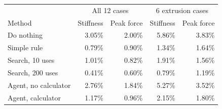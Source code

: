 \begin{tabular}{lrrrr}
\toprule
& \multicolumn{2}{c}{All 12 cases} & \multicolumn{2}{c}{6 extrusion cases} \\
Method & Stiffness & Peak force & Stiffness & Peak force \\
\midrule
Do nothing & 3.05\% & 2.00\% & 5.86\% & 3.83\% \\
Simple rule & 0.79\% & 0.90\% & 1.34\% & 1.64\% \\
Search, 10 uses & 1.01\% & 0.82\% & 1.91\% & 1.56\% \\
Search, 200 uses & 0.41\% & 0.60\% & 0.79\% & 1.19\% \\
Agent, no calculator & 2.76\% & 1.84\% & 5.27\% & 3.52\% \\
Agent, calculator & 1.17\% & 0.96\% & 2.15\% & 1.80\% \\
\bottomrule
\end{tabular}
